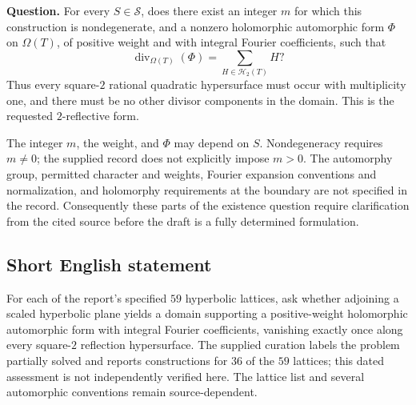 \documentclass[11pt]{article}
\begin{document}
\textbf{Question.} For every \(S\in\mathcal S\), does there exist an integer \(m\) for which this construction is nondegenerate, and a nonzero holomorphic automorphic form \(\Phi\) on \(\Omega(T)\), of positive weight and with integral Fourier coefficients, such that
\[
 \operatorname{div}_{\Omega(T)}(\Phi)
   =\sum_{H\in\mathscr H_2(T)} H?
\]
Thus every square-\(2\) rational quadratic hypersurface must occur with multiplicity one, and there must be no other divisor components in the domain. This is the requested \(2\)-reflective form.

The integer \(m\), the weight, and \(\Phi\) may depend on \(S\). Nondegeneracy requires \(m\ne0\); the supplied record does not explicitly impose \(m>0\). The automorphy group, permitted character and weights, Fourier expansion conventions and normalization, and holomorphy requirements at the boundary are not specified in the record. Consequently these parts of the existence question require clarification from the cited source before the draft is a fully determined formulation.
\subsection{Short English statement}
For each of the report's specified \(59\) hyperbolic lattices, ask whether adjoining a scaled hyperbolic plane yields a domain supporting a positive-weight holomorphic automorphic form with integral Fourier coefficients, vanishing exactly once along every square-\(2\) reflection hypersurface. The supplied curation labels the problem partially solved and reports constructions for \(36\) of the \(59\) lattices; this dated assessment is not independently verified here. The lattice list and several automorphic conventions remain source-dependent.
\end{document}

